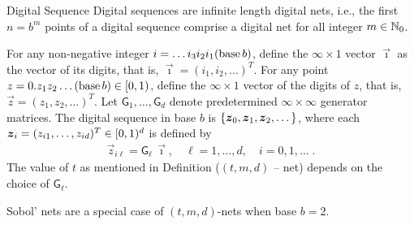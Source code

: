 \documentclass[handout, 10pt,compress,xcolor={usenames,dvipsnames}]{beamer} %
\begin{document}
\begin{frame}{Digital Sequence}
	\vspace{-4ex}
Digital sequences are infinite length digital nets, i.e., the first $n=b^m$ points of a digital sequence comprise a digital net for all integer $m \in \mathbb{N}_0$.

	\begin{Definition}%
		For any non-negative integer $i = \dots i_3 i_2 i_1(\textup{base} \, b)$, define the $\infty \times 1$ vector $\vec{\imath}$ as the vector of its digits, that is, $\vec{\imath} = (i_1, i_2, \dots)^T$. 
		For any point $z = 0.z_1 z_2 \dots (\textup{base}\, b) \in [0, 1)$, define the $\infty \times 1$ vector of the digits of $z$, that is, $\vec{z} = (z_1, z_2, \dots)^T$. 
		Let $ \mathsf{G}_1, \dots , \mathsf{G}_d$ denote predetermined $\infty \times \infty$ generator matrices. 
		The digital sequence in \textup{base} $b$ is $\{\boldsymbol{z}_0, \boldsymbol{z}_1, \boldsymbol{z}_2, \dots\}$, where each $\boldsymbol{z}_i = ( z_{i1}, \dots , z_{id})^T \in [0, 1)^d$ is defined by
		\vspace{-1ex}
		\begin{align*}
		\vec{z}_{i\ell} = \mathsf{G}_{\ell} \, \vec{\imath}, \quad \ell = 1, \dots, d, \quad i = 0, 1, \dots \;.
		\end{align*}
		\vspace{-1ex}
		The value of $t$ as mentioned in Definition ($(t, m, d)$ -- net) depends on the choice of $\mathsf{G}_{\ell}$.
	\end{Definition}
	
	Sobol' nets \cite{Sob76} are a special case of $(t,m, d)$-nets when base $b=2$. 
\end{frame}
\end{document}

